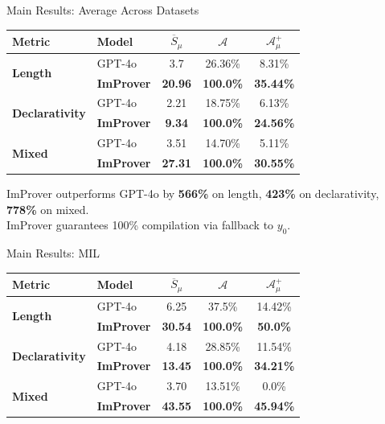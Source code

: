 \documentclass{beamer}
\newcommand{\good}[1]{\textcolor{improverGreen}{\textbf{#1}}}
\begin{document}
\begin{frame}{Main Results: Average Across Datasets}
\vspace{0.3em}
\begin{center}
\small
\begin{tabular}{ll|ccc}
\toprule
Metric & Model & $\overline{S}_\mu$ & $\mathcal{A}$ & $\mathcal{A}^+_\mu$\\
\midrule
\multirow{2}{*}{\textbf{Length}} & GPT-4o & 3.7 & 26.36\% & 8.31\%\\
& \textbf{ImProver} & \textbf{20.96} & \textbf{100.0\%} & \textbf{35.44\%}\\
\midrule
\multirow{2}{*}{\textbf{Declarativity}} & GPT-4o & 2.21 & 18.75\% & 6.13\%\\
& \textbf{ImProver} & \textbf{9.34} & \textbf{100.0\%} & \textbf{24.56\%}\\
\midrule
\multirow{2}{*}{\textbf{Mixed}} & GPT-4o & 3.51 & 14.70\% & 5.11\%\\
& \textbf{ImProver} & \textbf{27.31} & \textbf{100.0\%} & \textbf{30.55\%}\\
\bottomrule
\end{tabular}
\end{center}
\vspace{0.4em}
\small ImProver outperforms GPT-4o by \good{566\%} on length, \good{423\%} on declarativity, \good{778\%} on mixed.\\
ImProver guarantees 100\% compilation via fallback to $y_0$.
\end{frame}

\begin{frame}{Main Results: MIL}
\vspace{0.3em}
\begin{center}
\small
\begin{tabular}{ll|ccc}
\toprule
Metric & Model & $\overline{S}_\mu$ & $\mathcal{A}$ & $\mathcal{A}^+_\mu$\\
\midrule
\multirow{2}{*}{\textbf{Length}} & GPT-4o & 6.25 & 37.5\% & 14.42\%\\
& \textbf{ImProver} & \textbf{30.54} & \textbf{100.0\%} & \textbf{50.0\%}\\
\midrule
\multirow{2}{*}{\textbf{Declarativity}} & GPT-4o & 4.18 & 28.85\% & 11.54\%\\
& \textbf{ImProver} & \textbf{13.45} & \textbf{100.0\%} & \textbf{34.21\%}\\
\midrule
\multirow{2}{*}{\textbf{Mixed}} & GPT-4o & 3.70 & 13.51\% & 0.0\%\\
& \textbf{ImProver} & \textbf{43.55} & \textbf{100.0\%} & \textbf{45.94\%}\\
\bottomrule
\end{tabular}
\end{center}
\end{frame}
\end{document}
